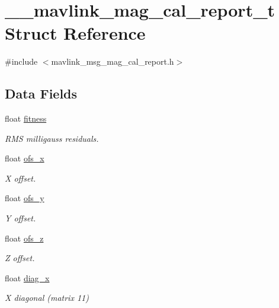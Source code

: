 \hypertarget{struct____mavlink__mag__cal__report__t}{\section{\+\_\+\+\_\+mavlink\+\_\+mag\+\_\+cal\+\_\+report\+\_\+t Struct Reference}
\label{struct____mavlink__mag__cal__report__t}
}


{\ttfamily \#include $<$mavlink\+\_\+msg\+\_\+mag\+\_\+cal\+\_\+report.\+h$>$}

\subsection*{Data Fields}
\begin{DoxyCompactItemize}
\item 
float \hyperlink{struct____mavlink__mag__cal__report__t_aa2b3a78763049fcf9fdf83868ffb24e7}{fitness}
\begin{DoxyCompactList}\small\item\em R\+M\+S milligauss residuals. \end{DoxyCompactList}\item 
float \hyperlink{struct____mavlink__mag__cal__report__t_aac34a98494944b7ecab442403181057d}{ofs\+\_\+x}
\begin{DoxyCompactList}\small\item\em X offset. \end{DoxyCompactList}\item 
float \hyperlink{struct____mavlink__mag__cal__report__t_aeaeb3dff124d7b06a6e5d2f9ea3333fe}{ofs\+\_\+y}
\begin{DoxyCompactList}\small\item\em Y offset. \end{DoxyCompactList}\item 
float \hyperlink{struct____mavlink__mag__cal__report__t_a3cdf756a1f57760dd0fef0c5268feb78}{ofs\+\_\+z}
\begin{DoxyCompactList}\small\item\em Z offset. \end{DoxyCompactList}\item 
float \hyperlink{struct____mavlink__mag__cal__report__t_a3c2deb83adbc14382b651695fa0b295e}{diag\+\_\+x}
\begin{DoxyCompactList}\small\item\em X diagonal (matrix 11) \end{DoxyCompactList}\item 

\end{DoxyCompactItemize}
